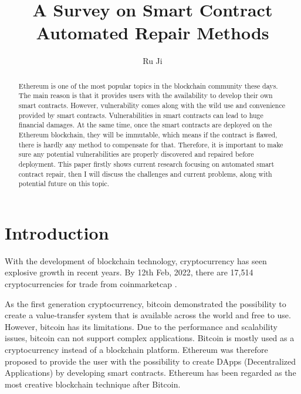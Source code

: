 \documentclass[sigplan,screen]{acmart}
\begin{document}
\title{A Survey on Smart Contract Automated Repair Methods}

\author{Ru Ji}


\begin{abstract}
Ethereum is one of the most popular topics in the blockchain community these days. The main reason is that it provides users with the availability to develop their own smart contracts. However, vulnerability comes along with the wild use and convenience provided by smart contracts. Vulnerabilities in smart contracts can lead to huge financial damages. At the same time, once the smart contracts are deployed on the Ethereum blockchain, they will be immutable, which means if the contract is flawed, there is hardly any method to compensate for that. Therefore, it is important to make sure any potential vulnerabilities are properly discovered and repaired before deployment. This paper firstly shows current research focusing on automated smart contract repair, then I will discuss the challenges and current problems, along with potential future on this topic.
\end{abstract}

\maketitle
\section{Introduction}
With the development of blockchain technology, cryptocurrency has seen explosive growth in recent years. By 12th Feb, 2022, there are 17,514 cryptocurrencies for trade from coinmarketcap \cite{coinmarketcap}.


As the first generation cryptocurrency, bitcoin \cite{nakamoto2008bitcoin} demonstrated the possibility to create a value-transfer system that is available across the world and free to use. However, bitcoin has its limitations. Due to the performance and scalability issues, bitcoin can not support complex applications. Bitcoin is mostly used as a cryptocurrency instead of a blockchain platform. Ethereum \cite{buterin2014next} was therefore proposed to provide the user with the possibility to create DApps (Decentralized Applications) by developing smart contracts. Ethereum has been regarded as the most creative blockchain technique after Bitcoin.
\end{document}
